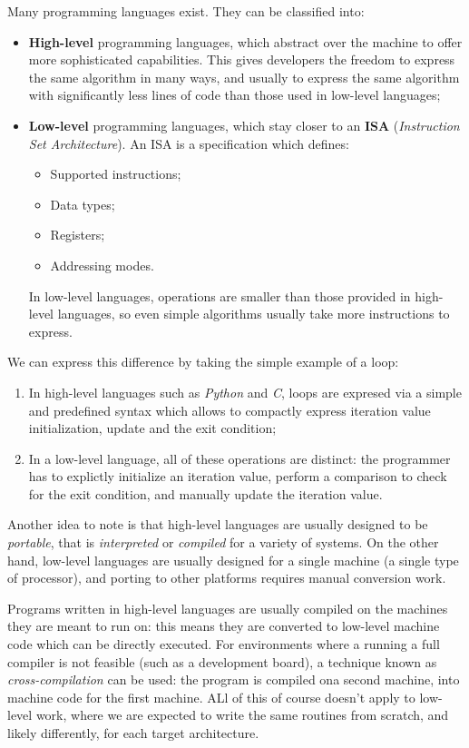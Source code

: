 \documentclass[a4paper,11pt]{article}
\begin{document}
Many programming languages exist.
They can be classified into:
\begin{itemize}
	\item \textbf{High-level} programming languages, which abstract over the machine to offer more sophisticated capabilities. This gives developers the freedom to express the same algorithm in many ways, and usually to express the same algorithm with significantly less lines of code than those used in low-level languages;
	\item \textbf{Low-level} programming languages, which stay closer to an \textbf{ISA} (\textit{Instruction Set Architecture}). An ISA is a specification which defines:
		\begin{itemize}
			\item Supported instructions;
			\item Data types;
			\item Registers;
			\item Addressing modes.
		\end{itemize}
		In low-level languages, operations are smaller than those provided in high-level languages, so even simple algorithms usually take more instructions to express.
\end{itemize}

We can express this difference by taking the simple example of a loop:
\begin{enumerate}
	\item In high-level languages such as \textit{Python} and \textit{C}, loops are expresed via a simple and predefined syntax which allows to compactly express iteration value initialization, update and the exit condition;
	\item In a low-level language, all of these operations are distinct: the programmer has to explictly initialize an iteration value, perform a comparison to check for the exit condition, and manually update the iteration value. 
\end{enumerate}

Another idea to note is that high-level languages are usually designed to be \textit{portable}, that is \textit{interpreted} or \textit{compiled} for a variety of systems.
On the other hand, low-level languages are usually designed for a single machine (a single type of processor), and porting to other platforms requires manual conversion work.

Programs written in high-level languages are usually compiled on the machines they are meant to run on: this means they are converted to low-level machine code which can be directly executed.
For environments where a running a full compiler is not feasible (such as a development board), a technique known as \textit{cross-compilation} can be used: the program is compiled ona second machine, into machine code for the first machine.
ALl of this of course doesn't apply to low-level work, where we are expected to write the same routines from scratch, and likely differently, for each target architecture.
\end{document}
